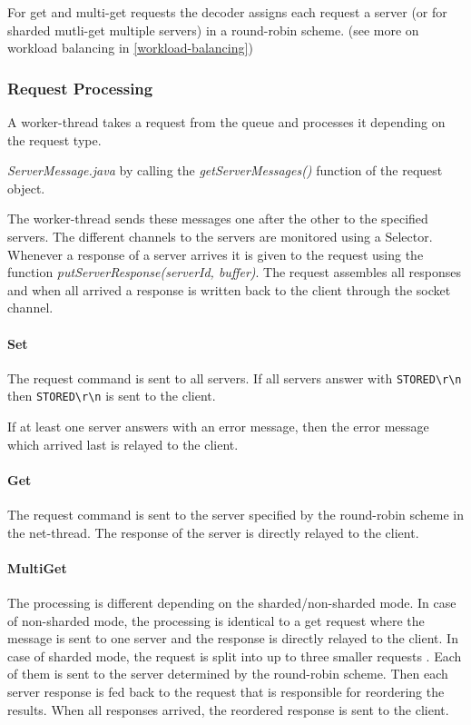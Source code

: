 \documentclass[report.tex]{subfiles}
\begin{document}
For get and multi-get requests the decoder assigns each request a server (or for sharded mutli-get multiple servers) in a round-robin scheme. (see more on workload balancing in \ref{workload-balancing})


\subsubsection{Request Processing}\label{request-processing}

A worker-thread takes a request from the queue and processes it depending on the request type.

\emph{ServerMessage.java} by calling the \emph{getServerMessages()} function of the request object.

The worker-thread sends these messages one after the other to the specified servers.
The different channels to the servers are monitored using a Selector. Whenever a response of a server arrives it 
is given to the request using the function \emph{putServerResponse(serverId, buffer)}. The request assembles all responses and when all arrived a response is written back to the client through the socket channel.

\paragraph{Set} The request command is sent to all servers. If all servers answer with \texttt{STORED\textbackslash r\textbackslash n} then \texttt{STORED\textbackslash r\textbackslash n} is sent to the client. 

If at least one server answers with an error message, then the error message which arrived last is relayed to the client.

\paragraph{Get} The request command is sent to the server specified by the round-robin scheme in the net-thread.
The response of the server is directly relayed to the client.

\paragraph{MultiGet} The processing is different depending on the sharded/non-sharded mode. In case of non-sharded mode, the processing is identical to a get request where the message is sent to one server and the response is directly relayed to the client. In case of sharded mode, the request is split into up to three smaller requests . Each of them is sent to the server determined by the round-robin scheme. Then each server response is fed back to the request that is responsible for reordering the results. When all responses arrived, the reordered response is sent to the client.
\end{document}
